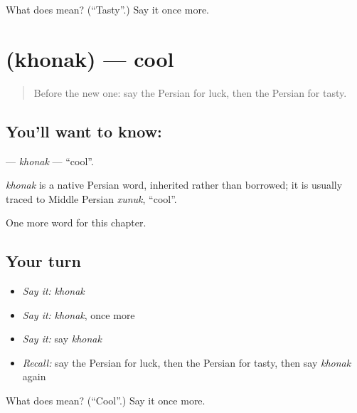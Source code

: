 \begin{tcolorbox}[breakable,colback=teal!4,colframe=teal!35!black,title={Before you move on}]
What does  mean? (\textquotedblleft{}Tasty\textquotedblright{}.) Say it once more.
\end{tcolorbox}
\section[\texorpdfstring{\fa{خنک} (khonak)}{خنک (khonak)}]{ (khonak) — cool}

\label{lesson:FA-C161-khonak}



\begin{quote}
Before the new one: say the Persian for luck, then the Persian for tasty.
\end{quote}

\subsection*{You'll want to know: }
\textbf{} — \emph{khonak} — \textquotedblleft{}cool\textquotedblright{}.

\begin{cousinweb}
\emph{khonak} is a native Persian word, inherited rather than borrowed; it is usually traced to Middle Persian \emph{xunuk}, \textquotedblleft{}cool\textquotedblright{}.
\end{cousinweb}

\begin{grammarlens}[title={What you've built}]
One more word for this chapter.
\end{grammarlens}

\subsection*{Your turn}
\begin{itemize}
\raggedright
  \item \emph{Say it:} \emph{khonak}
  \item \emph{Say it:} \emph{khonak}, once more
  \item \emph{Say it:} say \emph{khonak}
  \item \emph{Recall:} say the Persian for luck, then the Persian for tasty, then say \emph{khonak} again
\end{itemize}

\begin{tcolorbox}[breakable,colback=teal!4,colframe=teal!35!black,title={Before you move on}]
What does  mean? (\textquotedblleft{}Cool\textquotedblright{}.) Say it once more.
\end{tcolorbox}
